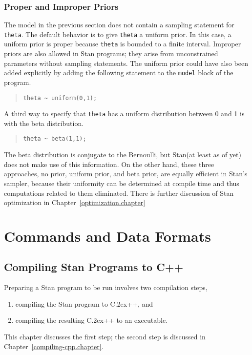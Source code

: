 \documentclass[10pt]{report}
\newcommand{\Stan}{Stan\xspace}
\newcommand*{\Cpp}{C\raise.2ex\hbox{\footnotesize ++}\xspace} %
\newcommand{\code}[1]{{\tt #1}}
\newcommand{\refchapter}[1]{Chapter~\ref{#1.chapter}}
\begin{document}
\section{Proper and Improper Priors}

The model in the previous section does not contain a sampling
statement for \code{theta}.  The default behavior is to give
\code{theta} a uniform prior.  In this case, a uniform prior is proper
because \code{theta} is bounded to a finite interval.  Improper priors
are also allowed in \Stan programs; they arise from unconstrained
parameters without sampling statements.  The uniform prior could have
also been added explicitly by adding the following statement to the
\code{model} block of the program.
%
\begin{quote}
\begin{Verbatim} 
theta ~ uniform(0,1);
\end{Verbatim}
\end{quote}
% 
A third way to specify that \code{theta} has a uniform distribution
between 0 and 1 is with the beta distribution.
%
\begin{quote}
\begin{Verbatim}
theta ~ beta(1,1);
\end{Verbatim}
\end{quote}
%
The beta distribution is conjugate to the Bernoulli, but \Stan (at
least as of yet) does not make use of this information.  On the other hand,
these three approaches, no prior, uniform prior, and beta prior,
are equally efficient in \Stan's sampler, because their uniformity
can be determined at compile time and thus computations related to
them eliminated.  There is further discussion of \Stan optimization
in \refchapter{optimization}


\part{Commands and Data Formats}

\chapter{Compiling Stan Programs to C++}\label{stanc.chapter}

Preparing a \Stan program to be run involves two compilation steps,
%
\begin{enumerate}
\item compiling the \Stan program to \Cpp, and
\item compiling the resulting \Cpp to an executable.
\end{enumerate}
%
This chapter discusses the first step; the second step is discussed in
\refchapter{compiling-cpp}.
\end{document}
